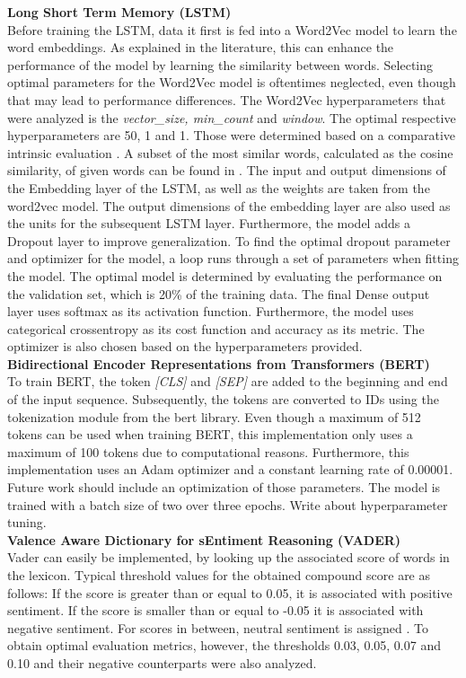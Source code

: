 \documentclass[11pt, a4paper]{article}
\begin{document}
\noindent\textbf{Long Short Term Memory (LSTM)}\\
Before training the LSTM, data it first is fed into a Word2Vec model to learn the word embeddings. As explained in the literature, this can enhance the performance of the model by learning the similarity between words.
Selecting optimal parameters for the Word2Vec model is oftentimes neglected, even though that may lead to performance differences.
The Word2Vec hyperparameters that were analyzed is the \emph{vector\_size, min\_count} and \emph{window}. The optimal respective hyperparameters are 50, 1 and 1. Those were determined based on a comparative intrinsic evaluation \citep{schnabel2015embeddings}.
A subset of the most similar words, calculated as the cosine similarity, of given words can be found in .
The input and output dimensions of the Embedding layer of the LSTM, as well as the weights are taken from the word2vec model.
The output dimensions of the embedding layer are also used as the units for the subsequent LSTM layer. Furthermore, the model adds a Dropout layer to improve generalization. To find the optimal dropout parameter and optimizer for the model,
a loop runs through a set of parameters when fitting the model. The optimal model is determined by evaluating the performance on the validation set, which is 20\% of the training data. 
The final Dense output layer uses softmax as its activation function. Furthermore, the model uses categorical crossentropy as its cost function and accuracy as its metric. The optimizer is also chosen based on the hyperparameters provided.\\

\noindent\textbf{Bidirectional Encoder Representations from Transformers (BERT)}\\
To train BERT, the token \emph{[CLS]} and \emph{[SEP]} are added to the beginning and end of the input sequence. Subsequently, the tokens are converted to IDs using the tokenization
module from the bert library. Even though a maximum of 512 tokens can be used when training BERT, this implementation only uses a maximum of 100 tokens due to computational reasons.
Furthermore, this implementation uses an Adam optimizer and a constant learning rate of 0.00001. Future work should include an optimization of those parameters. The model is trained with
a batch size of two over three epochs. Write about hyperparameter tuning.\\

\noindent\textbf{Valence Aware Dictionary for sEntiment Reasoning (VADER)}\\
Vader can easily be implemented, by looking up the associated score of words in the lexicon. Typical threshold values for the obtained compound score are as follows: 
If the score is greater than or equal to 0.05, it is associated with positive sentiment. If the score is smaller than or equal to -0.05 it is associated with negative sentiment. For scores
in between, neutral sentiment is assigned \citep{hutto2015vader}. To obtain optimal evaluation metrics, however, the thresholds 0.03, 0.05, 0.07 and 0.10 and their negative counterparts were
also analyzed.
\end{document}
